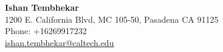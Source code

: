 \documentclass[10pt,fleqn]{article}
\begin{document}


\begin{center}
\LARGE \textbf{Ishan Tembhekar} \small \\[0.16cm]
1200 E. California Blvd, MC 105-50, Pasadena CA 91125 \\
Phone: +16269917232 \\
\href{mailto:ishan.tembhekar@caltech.edu}{ishan.tembhekar@caltech.edu} \hfill
\end{center}
\end{document}
